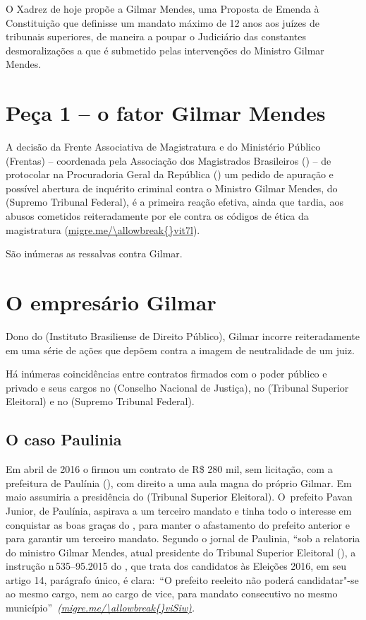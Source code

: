  

O Xadrez de hoje propõe a  Gilmar Mendes, uma Proposta de Emenda à
Constituição que definisse um mandato máximo de 12 anos aos juízes de
tribunais superiores, de maneira a poupar o Judiciário das constantes
desmoralizações a que é submetido pelas intervenções do Ministro Gilmar
Mendes.

\section{Peça 1 -- o fator Gilmar Mendes}

A decisão da Frente Associativa de Magistratura e do Ministério Público
(Frentas) -- coordenada pela Associação dos Magistrados Brasileiros
() -- de protocolar na Procuradoria Geral da República () um
pedido de apuração e possível abertura de inquérito criminal contra o
Ministro Gilmar Mendes, do  (Supremo Tribunal Federal), é a primeira
reação efetiva, ainda que tardia, aos abusos cometidos reiteradamente
por ele contra os códigos de ética da magistratura
(\url{migre.me/\allowbreak{}vit7l}).

São inúmeras as ressalvas contra Gilmar.

\section{O empresário Gilmar}

Dono do  (Instituto Brasiliense de Direito Público), Gilmar incorre
reiteradamente em uma série de ações que depõem contra a imagem de
neutralidade de um juiz.

Há inúmeras coincidências entre contratos firmados com o poder público e
privado e seus cargos no  (Conselho Nacional de Justiça), no 
(Tribunal Superior Eleitoral) e no  (Supremo Tribunal Federal).

\subsection{O caso Paulinia}

Em abril de 2016 o  firmou um contrato de R\$ 280 mil, sem licitação,
com a prefeitura de Paulínia (), com direito a uma aula magna do
próprio Gilmar. Em maio assumiria a presidência do  (Tribunal
Superior Eleitoral). O~prefeito Pavan Junior, de Paulínia, aspirava a um
terceiro mandato e tinha todo o interesse em conquistar as boas graças
do , para manter o afastamento do prefeito anterior e para garantir
um terceiro mandato. Segundo o jornal de Paulinia, ``sob a relatoria do
ministro Gilmar Mendes, atual presidente do Tribunal Superior Eleitoral
(), a instrução n\,535--95.2015 do , que trata dos candidatos às
Eleições 2016, em seu artigo 14, parágrafo único, é clara:~``O prefeito
reeleito não poderá candidatar"-se ao mesmo cargo, nem ao cargo de vice,
para mandato consecutivo no mesmo
município''~\emph{(\url{migre.me/\allowbreak{}viSiw)}.}

